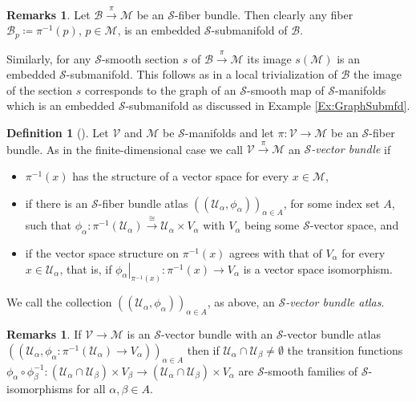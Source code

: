 \documentclass[12pt,a4paper]{article}
\theoremstyle{plain}
\theoremstyle{definition}
\newtheorem{definition}[theorem]{Definition}
\newtheorem{remarks}[theorem]{Remarks}
\newcommand{\Mcal}{\mathcal{M}}
\newcommand{\Scal}{\mathcal{S}}
\newcommand{\Ucal}{\mathcal{U}}
\begin{document}
\begin{remarks}
Let $\mathcal B\xrightarrow{\pi}\Mcal$ be an $\Scal$-fiber bundle. Then clearly any fiber $\mathcal B_p \coloneqq \pi^{-1}(p)$, $p\in \Mcal$, is an embedded $\Scal$-submanifold of $\mathcal B$. 

Similarly, for any $\Scal$-smooth section $s$ of $\mathcal B\xrightarrow{\pi}\Mcal$ its image $s(\Mcal)$ is an embedded $\Scal$-submanifold. This follows as in a local trivialization of $\mathcal B$ the image of the section $s$ corresponds to the graph of an $\Scal$-smooth map of $\Scal$-manifolds which is an embedded $\Scal$-submanifold as discussed in Example \ref{Ex:GraphSubmfd}. 
\end{remarks}


\begin{definition}[{\cite[Part I, Definition 4.3.1]{hamilton}}]
Let $\mathcal{V}$ and $\Mcal$ be $\Scal$-manifolds and let $\pi:\mathcal V\to \Mcal$ be an $\Scal$-fiber bundle. As in the finite-dimensional case we call $\mathcal{V}\xrightarrow{\pi}\Mcal$ an \textit{$\Scal$-vector bundle} if
\begin{itemize}
    \item $\pi^{-1}(x)$ has the structure of a vector space for every $x\in \Mcal$,
    \item if there is an $\Scal$-fiber bundle atlas $((\Ucal_\alpha,\phi_\alpha))_{\alpha\in A}$, for some index set $A$, such that $\phi_\alpha:\pi^{-1}(\Ucal_\alpha)\xrightarrow{\cong}\Ucal_\alpha \times V_\alpha$ with $V_\alpha$ being some $\Scal$-vector space, and
    \item if the vector space structure on $\pi^{-1}(x)$ agrees with that of $V_\alpha$ for every $x\in \Ucal_\alpha$, that is, if $\left.\phi_\alpha\right|_{\pi^{-1}(x)}:\pi^{-1}(x)\to V_\alpha$ is a vector space isomorphism.
\end{itemize}
We call the collection $((\Ucal_\alpha, \phi_\alpha))_{\alpha\in A}$, as above, an \textit{$\Scal$-vector bundle atlas}.
\end{definition}

\begin{remarks}
If $\mathcal V\to \Mcal$ is an $\Scal$-vector bundle with an $\Scal$-vector bundle atlas $((\Ucal_\alpha,\phi_\alpha:\pi^{-1}(\Ucal_\alpha)\to V_\alpha))_{\alpha\in A}$ then if $\Ucal_\alpha\cap \Ucal_\beta\neq \emptyset$ the transition functions 
$\phi_\alpha\circ\phi_\beta^{-1}:(\Ucal_\alpha\cap \Ucal_\beta)\times V_\beta\to (\Ucal_\alpha\cap \Ucal_\beta)\times V_\alpha$ are $\Scal$-smooth families of $\Scal$-isomorphisms for all $\alpha,\beta\in A$.
\end{remarks}
\end{document}
